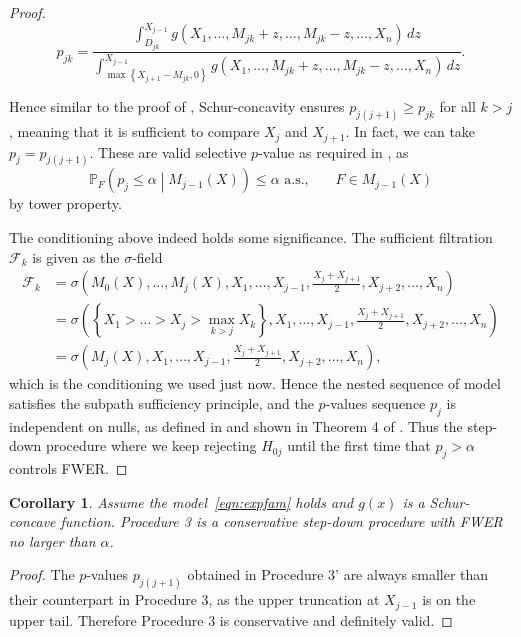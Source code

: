 \documentclass[11pt]{article}
\newtheorem{corollary}{Corollary}
\newcommand{\PP}{\mathbb{P}}
\begin{document}
\begin{proof}
$$p_{jk} = \frac{\int_{D_{jk}}^{X_{j-1}} g\left(X_1, \ldots, M_{jk} + z, \ldots, M_{jk} - z, \ldots, X_n\right) \,dz}{\int_{\max\left\{X_{j+1} - M_{jk}, 0\right\}}^{X_{j-1}} g\left(X_1, \ldots, M_{jk} + z, \ldots, M_{jk} - z, \ldots, X_n\right) \,dz}.$$

Hence similar to the proof of , Schur-concavity ensures $p_{j\left(j+1\right)} \ge p_{jk}$ for all $k>j$, meaning that it is sufficient to compare $X_j$ and $X_{j+1}$. In fact, we can take $p_j = p_{j\left(j+1\right)}$. These are valid selective $p$-value as required in \citet{Fithian:2015uj}, as
$$\PP_F \left(p_j \le \alpha \middle| M_{j-1}\left(X\right)\right) \le \alpha \text{ a.s.}, ~~~~~~~~ F \in M_{j-1}\left(X\right)$$
by tower property.

The conditioning above indeed holds some significance. The sufficient filtration \citep{Fithian:2015uj} $\mathscr{F}_k$ is given as the $\sigma$-field
\begin{align*}
\mathscr{F}_k & = \sigma\left(M_0\left(X\right), \ldots, M_j\left(X\right), X_1, \ldots, X_{j-1}, \frac{X_j + X_{j+1}}{2}, X_{j+2}, \ldots, X_n\right) \\
& = \sigma\left(\left\{X_1 > \ldots > X_j > \max_{k>j} X_k\right\}, X_1, \ldots, X_{j-1}, \frac{X_j + X_{j+1}}{2}, X_{j+2}, \ldots, X_n\right) \\
& = \sigma\left(M_j\left(X\right), X_1, \ldots, X_{j-1}, \frac{X_j + X_{j+1}}{2}, X_{j+2}, \ldots, X_n\right),
\end{align*}
which is the conditioning we used just now. Hence the nested sequence of model satisfies the subpath sufficiency principle, and the $p$-values sequence $p_j$ is independent on nulls, as defined in and shown in Theorem 4 of \citet{Fithian:2015uj}. Thus the step-down procedure where we keep rejecting $H_{0j}$ until the first time that $p_j > \alpha$ controls FWER.
\end{proof}

\begin{corollary}
Assume the model~\eqref{eqn:expfam} holds and $g\left(x\right)$ is a Schur-concave function. Procedure 3 is a conservative step-down procedure with FWER no larger than $\alpha$.
\end{corollary}

\begin{proof}
The $p$-values $p_{j\left(j+1\right)}$ obtained in Procedure 3' are always smaller than their counterpart in Procedure 3, as the upper truncation at $X_{j-1}$ is on the upper tail. Therefore Procedure 3 is conservative and definitely valid.
\end{proof}
\end{document}
